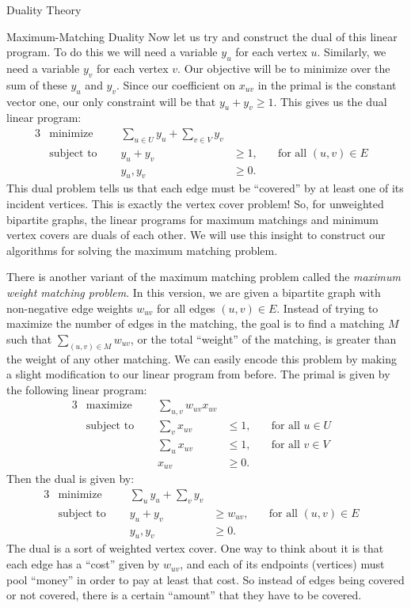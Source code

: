 \begin{section}{Duality Theory}
\begin{subsection}{Maximum-Matching Duality}
	Now let us try and construct the dual of this linear program. To do this we will need a variable 
	$y_u$ for each vertex $u$. Similarly, we need a variable $y_v$ for each vertex $v$. Our 
	objective will be to minimize over the sum of these $y_u$ and $y_v$. Since our coefficient on 
	$x_{uv}$
	in the primal is the constant vector one, our only constraint will be that $y_u + y_v \geq 1$. 
	This gives us the dual linear program:
	\begin{alignat}{3}
		& \text{minimize } & \sum_{u\in U} y_u + \sum_{v\in V} y_v& \\
		& \text{subject to } \quad & y_u + y_v & \geq 1, & \quad \text{for all } 
					(u,v)\in E & \\
				    && y_u,y_v & \geq 0.
	\end{alignat}
	This dual problem tells us that each edge must be ``covered'' by at least one of its incident 
	vertices. This is exactly the vertex cover problem! So, for unweighted bipartite graphs, the 
	linear programs for maximum matchings and minimum vertex covers are duals of each other. 
	We will use this insight to construct our algorithms for solving the maximum matching problem. 

	There is another variant of the maximum matching problem called the 
	\emph{maximum weight matching problem}. In this 
	version, we are given a bipartite graph with non-negative edge weights $w_{uv}$ for all 
	edges $(u,v)\in E$. Instead of trying to maximize the number of edges in the matching, the goal 
	is to find a matching $M$ such that $\sum_{(u,v) \in M} w_{uv}$, or the total ``weight'' of the 
	matching, is greater than the weight of any other matching. 
	We can easily encode this problem by making 
	a slight modification to our linear program from before. The primal is given by the following 
	linear program:
	\begin{alignat}{3}
		& \text{maximize } & \sum_{u,v} w_{uv}x_{uv}& \\
		& \text{subject to } \quad & \sum_{v} x_{uv} & \leq 1, & \quad 
					\text{for all } u\in U& \\
				     &\quad & \sum_{u} x_{uv} & \leq 1, & \quad 
				     	\text{for all } v\in V & \\
				&& x_{uv} & \geq 0.
	\end{alignat}
	Then the dual is given by:
	\begin{alignat}{3}
		& \text{minimize } & \sum_{u} y_u + \sum_v y_v& \\
		& \text{subject to } \quad & y_u + y_v & \geq w_{uv}, & \quad \text{for all } 
					(u,v)\in E & \\
				    && y_u,y_v & \geq 0.
	\end{alignat}
	The dual is a sort of weighted vertex cover. One way to think about it is that each edge 
	has a ``cost'' given by $w_{uv}$, and each of its endpoints (vertices) must pool ``money'' 
	in order 
	to pay at least that cost. So instead of edges being covered or not covered, there is a certain 
	``amount'' that they have to be covered.


\end{subsection}
\end{section}
